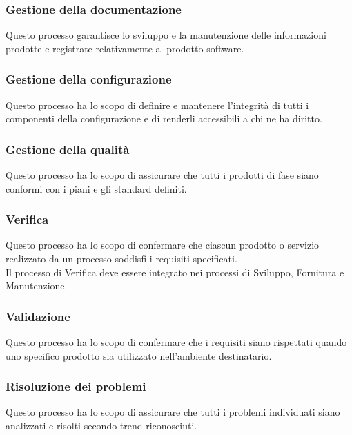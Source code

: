 \subsubsection{Gestione della documentazione}

Questo processo garantisce lo sviluppo e la manutenzione delle informazioni prodotte e registrate relativamente al prodotto software.


\subsubsection{Gestione della configurazione}

Questo processo ha lo scopo di definire e mantenere l'integrità di tutti i componenti della configurazione e di renderli accessibili a chi ne ha diritto.


\subsubsection{Gestione della qualità}

Questo processo ha lo scopo di assicurare che tutti i prodotti di fase siano conformi con i piani e gli standard definiti.


\subsubsection{Verifica}

Questo processo ha lo scopo di confermare che ciascun prodotto o servizio realizzato da un processo soddisfi i requisiti specificati.\\
Il processo di Verifica deve essere integrato nei processi di Sviluppo, Fornitura e Manutenzione.


\subsubsection{Validazione}

Questo processo ha lo scopo di confermare che i requisiti siano rispettati quando uno specifico prodotto sia utilizzato nell'ambiente destinatario.

\subsubsection{Risoluzione dei problemi}

Questo processo ha lo scopo di assicurare che tutti i problemi individuati siano analizzati e risolti secondo trend riconosciuti.


